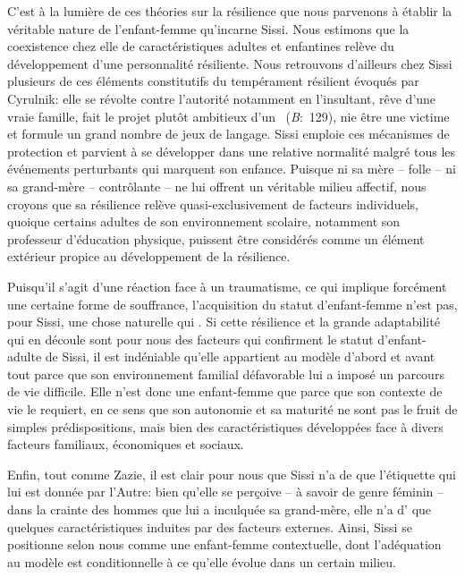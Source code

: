 \par
C'est à la lumière de ces théories sur la résilience que nous parvenons à établir la véritable nature de l'enfant-femme qu'incarne Sissi.
Nous estimons que la coexistence chez elle de caractéristiques adultes et enfantines relève du développement d'une personnalité résiliente.
Nous retrouvons d'ailleurs chez Sissi plusieurs de ces éléments constitutifs du tempérament résilient évoqués par Cyrulnik: elle se révolte contre l'autorité notamment en l'insultant, rêve d'une vraie famille, fait le projet plutôt ambitieux d'un ~(\textit{B}:~129), nie être une victime et formule un grand nombre de jeux de langage.
Sissi emploie ces mécanismes de protection et parvient à se développer dans une relative normalité malgré tous les événements perturbants qui marquent son enfance.
Puisque ni sa mère -- folle -- ni sa grand-mère -- contrôlante -- ne lui offrent un véritable milieu affectif, nous croyons que sa résilience relève quasi-exclusivement de facteurs individuels, quoique certains adultes de son environnement scolaire, notamment son professeur d'éducation physique, puissent être considérés comme un élément extérieur propice au développement de la résilience.
\par
Puisqu'il s'agit d'une réaction face à un traumatisme, ce qui implique forcément une certaine forme de souffrance, l'acquisition du statut d'enfant-femme n'est pas, pour Sissi, une chose naturelle qui .
Si cette résilience et la grande adaptabilité qui en découle sont pour nous des facteurs qui confirment le statut d'enfant-adulte de Sissi, il est indéniable qu'elle appartient au modèle d'abord et avant tout parce que son environnement familial défavorable lui a imposé un parcours de vie difficile.
Elle n'est donc une enfant-femme que parce que son contexte de vie le requiert, en ce sens que son autonomie et sa maturité ne sont pas le fruit de simples prédispositions, mais bien des caractéristiques développées face à divers facteurs familiaux, économiques et sociaux.
\par
Enfin, tout comme Zazie, il est clair pour nous que Sissi n'a de  que l'étiquette qui lui est donnée par l'Autre: bien qu'elle se perçoive  -- à savoir de genre féminin -- dans la crainte des hommes que lui a inculquée sa grand-mère, elle n'a d' que quelques caractéristiques induites par des facteurs externes.
Ainsi, Sissi se positionne selon nous comme une enfant-femme contextuelle, dont l'adéquation au modèle est conditionnelle à ce qu'elle évolue dans un certain milieu.
